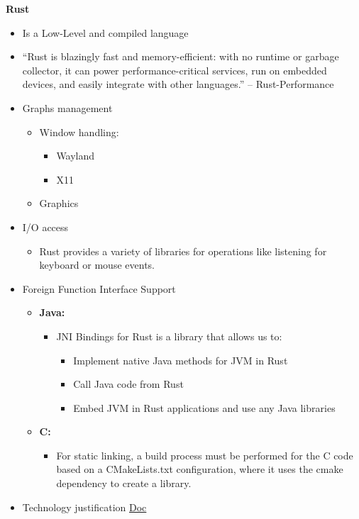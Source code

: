 \textbf{Rust}
\begin{itemize}
    \item Is a Low-Level and compiled language
    \item ``Rust is blazingly fast and memory-efficient: with no runtime or garbage collector, it can power performance-critical services, run on embedded devices, and easily integrate with other languages.'' – Rust-Performance
    \item Graphs management
    \begin{itemize}
        \item Window handling: 
        \begin{itemize}
            \item Wayland
            \item X11
        \end{itemize}
        \item Graphics
    \end{itemize}
    \item I/O access
    \begin{itemize}
        \item Rust provides a variety of libraries for operations like listening for keyboard or mouse events.
    \end{itemize}
    \item Foreign Function Interface Support
    \begin{itemize}
        \item \textbf{Java:}
        \begin{itemize}
            \item JNI Bindings for Rust is a library that allows us to:
            \begin{itemize}
                \item Implement native Java methods for JVM in Rust
                \item Call Java code from Rust
                \item Embed JVM in Rust applications and use any Java libraries
            \end{itemize}
    
        \end{itemize}
        \item \textbf{C:}
        \begin{itemize}
            \item For static linking, a build process must be performed for the C code based on a CMakeLists.txt configuration, where it uses the cmake dependency to create a library.
        
        \end{itemize}
    \end{itemize}
    \item Technology justification \href{https://docs.google.com/document/d/1OWdCxe9lFPcMpADiyAyRCWGAioo0fwIuzMuRER24MHM/edit}{Doc}
\end{itemize}
